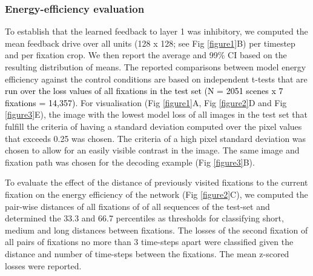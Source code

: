 \documentclass[10pt,letterpaper]{article}
\begin{document}
\subsubsection{Energy-efficiency evaluation}
To establish that the learned feedback to layer 1 was inhibitory, we computed the mean feedback drive over all units (128 x 128; see Fig \ref{figure1}B) per timestep and per fixation crop. We then report the average and 99\% CI based on the resulting distribution of means. The reported comparisons between model energy efficiency against the control conditions are based on independent t-tests that are \textcolor{black}{run over the loss values of all fixations in the test set (N = 2051 scenes x 7 fixations = 14,357)}.
For visualisation (Fig \ref{figure1}A, Fig \ref{figure2}D and Fig \ref{figure3}E), the image with the lowest model loss of all images in the test set that fulfill the criteria of having a standard deviation computed over the pixel values that exceeds 0.25 was chosen. The criteria of a high pixel standard deviation was chosen to allow for an easily visible contrast in the image. The same image and fixation path was chosen for the decoding example (Fig \ref{figure3}B).

To evaluate the effect of the distance of previously visited fixations to the current fixation on the energy efficiency of the network (Fig \ref{figure2}C), we computed the pair-wise distances of all fixations of of all sequences of the test-set and determined the 33.3 and 66.7 percentiles as thresholds for classifying short, medium and long distances between fixations. The losses of the second fixation of all pairs of fixations no more than 3 time-steps apart were classified given the distance and number of time-steps between the fixations. The mean z-scored losses were reported.
\end{document}
